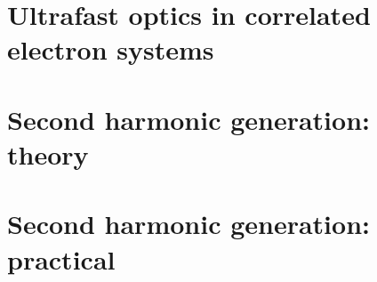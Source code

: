 \documentclass[
    letterpaper,
    12pt,
    openbib,
]{memoir}
\begin{document}
\frontmatter*


\acknowledgements

\clearpage
\preface

\clearpage

\tableofcontents
\clearpage
\listoffigures
\clearpage
\listoftables
\clearpage

\mainmatter*
\chapter{Ultrafast optics in correlated electron systems\label{ch:intro}}

\chapter{Second harmonic generation: theory\label{ch:shgtheory}}

\chapter{Second harmonic generation: practical}\label{ch:shgpractice}

% 
% 
% 

\backmatter*

\end{document}
